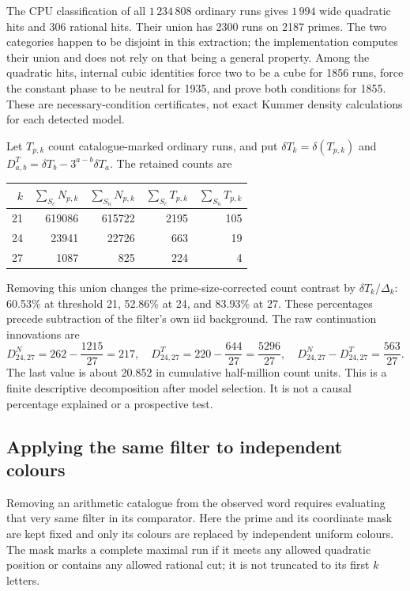 \documentclass[11pt]{article}
\theoremstyle{definition}\newtheorem{definition}[theorem]{Definition}
\begin{document}
The CPU classification of all $1\,234\,808$
ordinary runs gives $1\,994$ wide quadratic hits
and 306 rational hits. Their union has 2300 runs
on 2187 primes. The two categories happen to be
disjoint in this extraction; the implementation
computes their union and does not rely on that
being a general property.
Among the quadratic hits, internal cubic
identities force two to be a cube for 1856 runs,
force the constant phase to be neutral for 1935,
and prove both conditions for 1855.
These are necessary-condition certificates,
not exact Kummer density calculations for
each detected model.

Let $T_{p,k}$ count catalogue-marked ordinary runs, and put
$\delta T_k=\delta(T_{p,k})$ and
$D^T_{a,b}=\delta T_b-3^{a-b}\delta T_a$. The retained counts are
\begin{center}
\begin{tabular}{r rrrr}
\toprule
$k$&$\sum_{S_c}N_{p,k}$&$\sum_{S_n}N_{p,k}$&$\sum_{S_c}T_{p,k}$&$\sum_{S_n}T_{p,k}$\\
\midrule
21&619086&615722&2195&105\\
24&23941&22726&663&19\\
27&1087&825&224&4\\
\bottomrule
\end{tabular}
\end{center}
Removing this union changes the prime-size-corrected count contrast
by $\delta T_k/\Delta_k$: 60.53\% at threshold 21, 52.86\% at 24,
and 83.93\% at 27. These percentages precede subtraction of the
filter's own iid background. The raw continuation innovations are
\[
 D^N_{24,27}=262-\frac{1215}{27}=217,\quad
 D^T_{24,27}=220-\frac{644}{27}=\frac{5296}{27},\quad
 D^N_{24,27}-D^T_{24,27}=\frac{563}{27}.
\]
The last value is about 20.852 in cumulative half-million count units.
This is a finite descriptive decomposition
after model selection. It is not a causal
percentage explained or a prospective test.

\subsection{Applying the same filter to independent colours}
Removing an arithmetic catalogue from the observed
word requires evaluating that very same filter
in its comparator. Here the prime and its coordinate
mask are kept fixed and only its colours are
replaced by independent uniform colours.
The mask marks a complete maximal run if it meets
any allowed quadratic position or contains
any allowed rational cut; it is not truncated
to its first $k$ letters.
\end{document}
